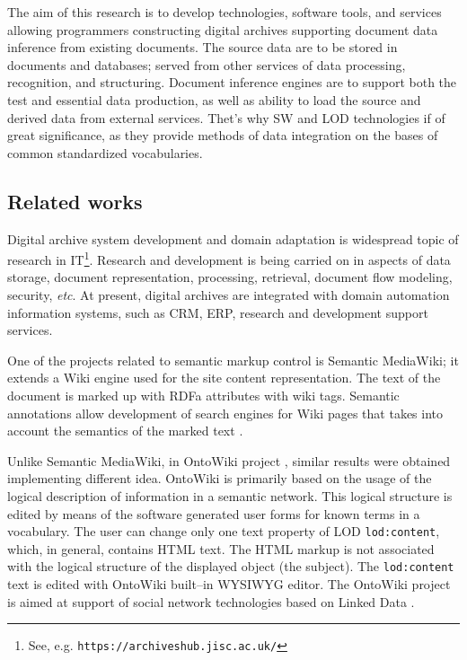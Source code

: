 \documentclass[conference,a4paper]{IEEEtran}
\providecommand\url[1]{\texttt{#1}}
\begin{document}
The aim of this research is to develop technologies, software tools, and services allowing programmers constructing digital archives supporting document data inference from existing documents.  The source data are to be stored in documents and databases; served from other services of data processing, recognition, and structuring.  Document inference engines are to support both the test and essential data production, as well as ability to load the source and derived data from external services.  Thet's why SW and LOD technologies if of great significance, as they provide methods of data integration on the bases of common standardized vocabularies.

\subsection{Related works}
\label{sec:relwks}

Digital archive system development and domain adaptation is wide\-spre\-ad topic of research in IT\footnote{See, e.g. \url{https://archiveshub.jisc.ac.uk/}}.  Research and development is being carried on in aspects of data storage, document representation, processing, retrieval, document flow modeling, security, \textit{etc}.  At present, digital archives are integrated with domain automation information systems, such as CRM, ERP, research and development support services.

One of the projects related to semantic markup control is Semantic MediaWiki; it extends a Wiki engine used for the site content representation.  The text of the document is marked up with RDFa attributes with wiki tags.  Semantic annotations allow development of search engines for Wiki pages that takes into account the semantics of the marked text \cite{c6}.

Unlike Semantic MediaWiki, in OntoWiki project \cite{b6}, similar results were obtained implementing different idea.  OntoWiki is primarily based on the usage of the logical description of information in a semantic network.  This logical structure is edited by means of the software generated user forms for known terms in a vocabulary.  The user can change only one text property of LOD \texttt{lod:content}, which, in general, contains HTML text.  The HTML markup is not associated with the logical structure of the displayed object (the subject).  The \texttt{lod:content} text is edited with OntoWiki built--in WYSIWYG editor.  The OntoWiki project is aimed at support of social network technologies based on Linked Data \cite{b6}.
\end{document}
